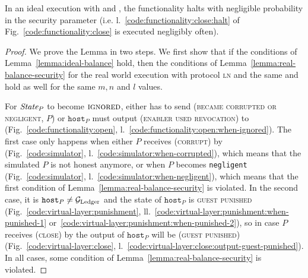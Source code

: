 \begin{lemma}[No halt]
\label{lemma:no-halt}
  In an ideal execution with \fchan and \simulator, the functionality halts with
  negligible probability in the security parameter (i.e.
  l.~\ref{code:functionality:close:halt} of Fig.~\ref{code:functionality:close}
  is executed negligibly often).
\end{lemma}

\begin{proof}
  We prove the Lemma in two steps. We first show that if the conditions of
  Lemma~\ref{lemma:ideal-balance} hold, then the conditions of
  Lemma~\ref{lemma:real-balance-security} for the real world execution with
  protocol \textsc{ln} and the same \environment and \adversary hold as well for
  the same $m, n$ and $l$ values.

  For $\itistate_P$ to become $\textsc{ignored}$, either \simulator has to send
  (\textsc{became corrupted or negligent}, $P$) or $\texttt{host}_P$ must output
  (\textsc{enabler used revocation}) to \fchan
  (Fig.~\ref{code:functionality:open},
  l.~\ref{code:functionality:open:when-ignored}). The first case only happens
  when either $P$ receives (\textsc{corrupt}) by \adversary
  (Fig.~\ref{code:simulator}, l.~\ref{code:simulator:when-corrupted}), which
  means that the simulated $P$ is not honest anymore, or when $P$ becomes
  \texttt{negligent} (Fig.~\ref{code:simulator},
  l.~\ref{code:simulator:when-negligent}), which means that the first condition
  of Lemma~\ref{lemma:real-balance-security} is violated. In the second case, it
  is $\texttt{host}_P \neq \mathcal{G}_{\mathrm{Ledger}}$ and the state of $\texttt{host}_P$ is
  \textsc{guest punished} (Fig.~\ref{code:virtual-layer:punishment},
  ll.~\ref{code:virtual-layer:punishment:when-punished-1}
  or~\ref{code:virtual-layer:punishment:when-punished-2}), so in case $P$ receives
  (\textsc{close}) by \environment the output of $\texttt{host}_P$ will be
  (\textsc{guest punished}) (Fig.~\ref{code:virtual-layer:close},
  l.~\ref{code:virtual-layer:close:output-guest-punished}). In all cases, some
  condition of Lemma~\ref{lemma:real-balance-security} is violated.


\end{proof}
